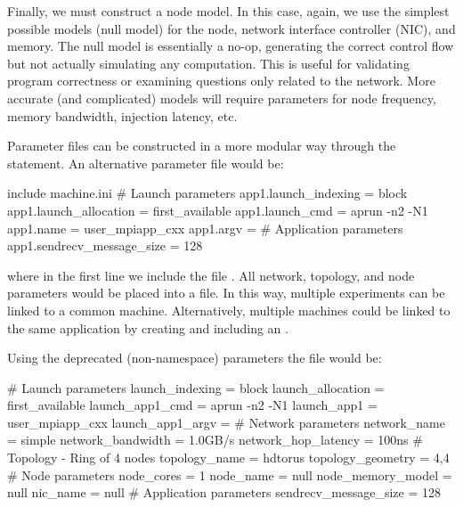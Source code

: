 Finally, we must construct a node model.  
In this case, again, we use the simplest possible models (null model) for the node, 
network interface controller (NIC), and memory.  
The null model is essentially a no-op, generating the correct control flow but not actually simulating any computation. 
This is useful for validating program correctness or examining questions only related to the network.  
More accurate (and complicated) models will require parameters for node frequency, memory bandwidth, injection latency, etc.

Parameter files can be constructed in a more modular way through the  statement.  
An alternative parameter file would be:

\begin{ViFile}
include machine.ini
# Launch parameters
app1.launch_indexing = block
app1.launch_allocation = first_available
app1.launch_cmd = aprun -n2 -N1
app1.name = user_mpiapp_cxx
app1.argv = 
# Application parameters
app1.sendrecv_message_size = 128
\end{ViFile}
where in the first line we include the file .  
All network, topology, and node parameters would be placed into a  file.  
In this way, multiple experiments can be linked to a common machine.  
Alternatively, multiple machines could be linked to the same application by creating and including an .

Using the deprecated (non-namespace) parameters the file would be:

\begin{ViFile}
# Launch parameters
launch_indexing = block
launch_allocation = first_available
launch_app1_cmd = aprun -n2 -N1
launch_app1 = user_mpiapp_cxx
launch_app1_argv = 
# Network parameters
network_name = simple
network_bandwidth = 1.0GB/s
network_hop_latency = 100ns
# Topology - Ring of 4 nodes
topology_name = hdtorus
topology_geometry = 4,4
# Node parameters
node_cores = 1
node_name = null
node_memory_model = null
nic_name = null
# Application parameters
sendrecv_message_size = 128
\end{ViFile}

